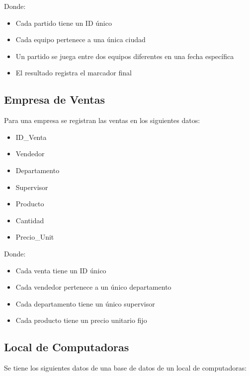 \documentclass[12pt]{article}
\begin{document}
Donde:
\begin{itemize}
    \item Cada partido tiene un ID único
    \item Cada equipo pertenece a una única ciudad
    \item Un partido se juega entre dos equipos diferentes en una fecha específica
    \item El resultado registra el marcador final
\end{itemize}

\subsection{Empresa de Ventas}
Para una empresa se registran las ventas en los siguientes datos:

\vspace{0.5em}

\begin{minipage}[t]{0.48\textwidth}
\begin{itemize}
    \item ID\_Venta
    \item Vendedor
    \item Departamento
    \item Supervisor
\end{itemize}
\end{minipage}
\begin{minipage}[t]{0.48\textwidth}
\begin{itemize}
    \item Producto
    \item Cantidad
    \item Precio\_Unit
\end{itemize}
\end{minipage}

\vspace{1em}

Donde:
\begin{itemize}
    \item Cada venta tiene un ID único
    \item Cada vendedor pertenece a un único departamento
    \item Cada departamento tiene un único supervisor
    \item Cada producto tiene un precio unitario fijo
\end{itemize}

\subsection{Local de Computadoras}
Se tiene los siguientes datos de una base de datos de un local de computadoras:
\end{document}

